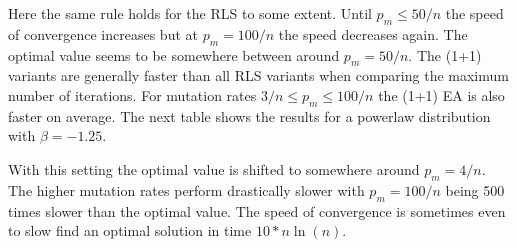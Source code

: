 Here the same rule holds for the RLS to some extent.
Until $p_m\le50/n$ the speed of convergence increases but at $p_m=100/n$ the speed decreases again.
The optimal value seems to be somewhere between around $p_m=50/n$.
The (1+1) variants are generally faster than all RLS variants when comparing the maximum number of iterations.
For mutation rates $3/n\le p_m \le 100/n$ the (1+1) EA is also faster on average.
The next table shows the results for a powerlaw distribution with $\beta=-1.25$.



With this setting the optimal value is shifted to somewhere around $p_m=4/n$.
The higher mutation rates perform drastically slower with $p_m=100/n$ being 500 times slower than the optimal value.
The speed of convergence is sometimes even to slow find an optimal solution in time $10*n\ln(n)$.
